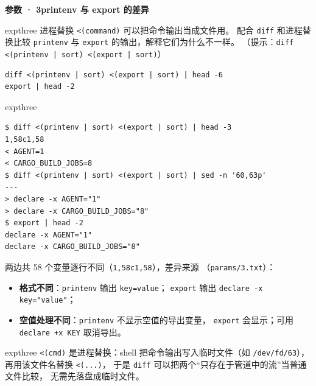 \documentclass[11pt,a4paper,fontset=none]{ctexart}
\newcommand{\hwbanner}[3]{%
  \par\vspace{1.1em}
  \begin{tcolorbox}[enhanced, colback=#1!8, colframe=#1!75!black,
    boxrule=0.8pt, arc=2pt, left=7pt, right=7pt, top=4pt, bottom=4pt,
    before skip=1.1em]
    {\bfseries\color{#1!75!black}#2\qquad #3}
  \end{tcolorbox}
  \par\vspace{0.1em}\noindent\ignorespaces
}
\newcommand{\sublabel}[2]{%
  \par\vspace{0.8em}\noindent{\bfseries\color{#1!75!black}#2}\par\nobreak\vspace{0.25em}\noindent\ignorespaces
}
\begin{document}
\hwbanner{expthree}{参数 · 3}{printenv 与 export 的差异}
\begin{reqbox}{expthree}
  进程替换 \texttt{<(command)} 可以把命令输出当成文件用。
  配合 \texttt{diff} 和进程替换比较 \texttt{printenv} 与 \texttt{export}
  的输出，解释它们为什么不一样。
  （提示：\texttt{diff <(printenv | sort) <(export | sort)}）
\end{reqbox}
\sublabel{expthree}{\faTerminal\ 操作}
\begin{lstlisting}[style=shell]
diff <(printenv | sort) <(export | sort) | head -6
export | head -2
\end{lstlisting}
\begin{resbox}{expthree}
\begin{lstlisting}[style=output]
$ diff <(printenv | sort) <(export | sort) | head -3
1,58c1,58
< AGENT=1
< CARGO_BUILD_JOBS=8
$ diff <(printenv | sort) <(export | sort) | sed -n '60,63p'
---
> declare -x AGENT="1"
> declare -x CARGO_BUILD_JOBS="8"
$ export | head -2
declare -x AGENT="1"
declare -x CARGO_BUILD_JOBS="8"
\end{lstlisting}
两边共 58 个变量逐行不同（\texttt{1,58c1,58}），差异来源
（\texttt{params/3.txt}）：
\begin{itemize}[leftmargin=1.4em, itemsep=1pt]
  \item \textbf{格式不同}：\texttt{printenv} 输出 \texttt{key=value}；
        \texttt{export} 输出 \texttt{declare -x key="value"}；
  \item \textbf{空值处理不同}：\texttt{printenv} 不显示空值的导出变量，
        \texttt{export} 会显示；可用 \texttt{declare +x KEY} 取消导出。
\end{itemize}
\end{resbox}
\begin{trapbox}{expthree}
  \texttt{<(cmd)} 是进程替换：shell 把命令输出写入临时文件（如
  \texttt{/dev/fd/63}），再用该文件名替换 \texttt{<(...)}，
  于是 \texttt{diff} 可以把两个“只存在于管道中的流”当普通文件比较，
  无需先落盘成临时文件。
\end{trapbox}
\end{document}
